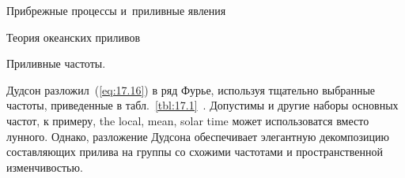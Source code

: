 \begin{chapter}{Прибрежные процессы и~приливные явления}
\begin{section}{Теория океанских приливов}
\begin{paragraph}{Приливные частоты.}

Дудсон разложил~(\ref{eq:17.16}) в ряд Фурье, используя тщательно выбранные
частоты, приведенные в табл.~\ref{tbl:17.1}~\cite{Doodson:1922}. 
Допустимы и другие наборы основных частот, к примеру,
the local, mean, solar time может использоватся вместо лунного.
Однако, разложение Дудсона обеспечивает элегантную декомпозицию составляющих
прилива на группы со схожими частотами и пространственной изменчивостью.
%


\end{paragraph}
\end{section}
\end{chapter}
